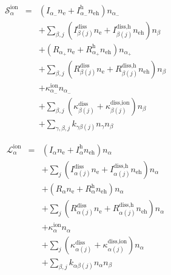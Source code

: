 \documentclass[12pt, letterpaper]{article}
\begin{document}
\begin{eqnarray}
\mathcal{S}^{\text{ion}}_{\alpha} & = & \left( I_{\alpha_{-}} n_{\text{e}} + I_{\alpha_{-}}^{\text{h}} n_{\text{eh}} \right) n_{\alpha_{-}} \nonumber \\
& & + \sum_{\beta,j} \left( I^{\text{diss}}_{\beta \left( j \right)} n_{\text{e}} + I^{\text{diss,h}}_{\beta \left( j \right)} n_{\text{eh}} \right) n_{\beta} \nonumber \\
& & + \left( R_{\alpha_{+}} n_{\text{e}} + R_{\alpha_{+}}^{\text{h}} n_{\text{eh}} \right) n_{\alpha_{+}} \nonumber \\
& & + \sum_{\beta,j} \left( R^{\text{diss}}_{\beta \left( j \right)} n_{\text{e}} + R^{\text{diss,h}}_{\beta \left( j \right)} n_{\text{eh}} \right) n_{\beta} \nonumber \\
& & + \kappa_{\alpha_{-}}^{\text{ion}} n_{\alpha_{-}} \nonumber \\
& & + \sum_{\beta,j} \left( \kappa^{\text{diss}}_{\beta \left( j \right)} + \kappa^{\text{diss,ion}}_{\beta \left( j \right)} \right) n_{\beta} \nonumber \\
& & + \sum_{\gamma, \beta, j} k_{\gamma \beta \left( j \right)} n_{\gamma} n_{\beta}
\end{eqnarray}

\begin{eqnarray}
\mathcal{L}^{\text{ion}}_{\alpha} & = & \left( I_{\alpha} n_{\text{e}} + I_{\alpha}^{\text{h}} n_{\text{eh}} \right) n_{\alpha} \nonumber \\
& & + \sum_{j} \left( I^{\text{diss}}_{\alpha \left( j \right)} n_{\text{e}} + I^{\text{diss,h}}_{\alpha \left( j \right)} n_{\text{eh}} \right) n_{\alpha} \nonumber \\
& & + \left( R_{\alpha} n_{\text{e}} + R_{\alpha}^{\text{h}} n_{\text{eh}} \right) n_{\alpha} \nonumber \\
& & + \sum_{j} \left( R^{\text{diss}}_{\alpha \left( j \right)} n_{\text{e}} + R^{\text{diss,h}}_{\alpha \left( j \right)} n_{\text{eh}} \right) n_{\alpha} \nonumber \\
& & + \kappa_{\alpha}^{\text{ion}} n_{\alpha} \nonumber \\
& & + \sum_{j} \left( \kappa^{\text{diss}}_{\alpha \left( j \right)} + \kappa^{\text{diss,ion}}_{\alpha \left( j \right)} \right) n_{\alpha} \nonumber \\
& & + \sum_{\beta, j} k_{\alpha \beta \left( j \right)} n_{\alpha} n_{\beta}
\end{eqnarray}
\end{document}
